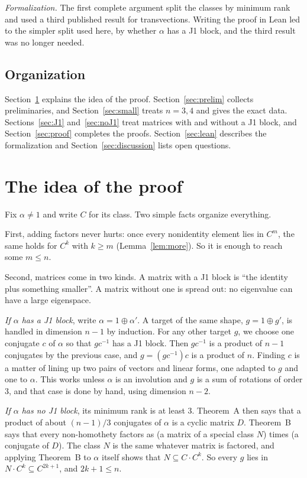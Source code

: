 \documentclass[11pt]{amsart}
\theoremstyle{definition}
\theoremstyle{remark}
\begin{document}
\emph{Formalization.} The first complete argument split the classes by minimum rank and used a
third published result for transvections. Writing the proof in Lean led to the simpler split used
here, by whether $\alpha$ has a J1 block, and the third result was no longer needed.

\subsection{Organization}
Section~\ref{sec:overview} explains the idea of the proof. Section~\ref{sec:prelim} collects
preliminaries, and Section~\ref{sec:small} treats $n=3,4$ and gives the exact data.
Sections~\ref{sec:J1} and~\ref{sec:noJ1} treat matrices with and without a J1 block, and
Section~\ref{sec:proof} completes the proofs. Section~\ref{sec:lean} describes the formalization
and Section~\ref{sec:discussion} lists open questions.

\section{The idea of the proof}\label{sec:overview}

Fix $\alpha\ne1$ and write $C$ for its class. Two simple facts organize everything.

First, adding factors never hurts: once every nonidentity element lies in $C^m$, the same holds
for $C^k$ with $k\ge m$ (Lemma~\ref{lem:more}). So it is enough to reach some $m\le n$.

Second, matrices come in two kinds. A matrix with a J1 block is ``the identity plus something
smaller''. A matrix without one is spread out: no eigenvalue can have a large eigenspace.

\emph{If $\alpha$ has a J1 block}, write $\alpha=1\oplus\alpha'$. A target of the same shape,
$g=1\oplus g'$, is handled in dimension $n-1$ by induction. For any other target $g$, we choose one
conjugate $c$ of $\alpha$ so that $gc^{-1}$ has a J1 block. Then $gc^{-1}$ is a product of $n-1$
conjugates by the previous case, and $g=(gc^{-1})c$ is a product of $n$. Finding $c$ is a matter of
lining up two pairs of vectors and linear forms, one adapted to $g$ and one to $\alpha$. This works
unless $\alpha$ is an involution and $g$ is a sum of rotations of order $3$, and that case is done
by hand, using dimension $n-2$.

\emph{If $\alpha$ has no J1 block}, its minimum rank is at least $3$. Theorem~A then says that a
product of about $(n-1)/3$ conjugates of $\alpha$ is a cyclic matrix $D$. Theorem~B says that
every non-homothety factors as (a matrix of a special class $N$) times (a conjugate of $D$). The
class $N$ is the same whatever matrix is factored, and applying Theorem~B to $\alpha$ itself shows
that $N\subseteq C\cdot C^{k}$. So every $g$ lies in $N\cdot C^k\subseteq C^{2k+1}$, and
$2k+1\le n$.
\end{document}
